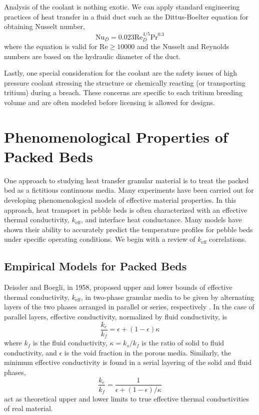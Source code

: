 \documentclass[11pt]{report} %
\begin{document}
Analysis of the coolant is nothing exotic. We can apply standard engineering practices of heat transfer in a fluid duct such as the Dittus-Boelter equation for obtaining Nusselt number,
\begin{equation}
\text{Nu}_D = 0.023 \text{Re}_D^{4/5}\text{Pr}^{0.3}
\end{equation}
where the equation is valid for Re$\ge 10000$ and the Nusselt and Reynolds numbers are based on the hydraulic diameter of the duct.

Lastly, one special consideration for the coolant are the safety issues of high pressure coolant stressing the structure or chemically reacting (or transporting tritium) during a breach. These concerns are specific to each tritium breeding volume and are often modeled before licensing is allowed for designs.


\section{Phenomenological Properties of Packed Beds}
One approach to studying heat transfer granular material is to treat the packed bed as a fictitious continuous media. Many experiments have been carried out for developing phenomenological models of effective material properties. In this approach, heat transport in pebble beds is often characterized with an effective thermal conductivity, $k_\text{eff}$, and interface heat conductance. Many models have shown their ability to accurately predict the temperature profiles for pebble beds under specific operating conditions. We begin with a review of $k_\text{eff}$ correlations.

\subsection{Empirical Models for Packed Beds}
Deissler and Boegli, in 1958, proposed upper and lower bounds of effective thermal conductivity, $k_\text{eff}$, in two-phase granular media to be given by alternating layers of the two phases arranged in parallel or series, respectively \cite{Deissler1958}. In the case of parallel layers, effective conductivity, normalized by fluid conductivity, is
\begin{equation}\label{eq:keff-parallel}
	\frac{k_e}{k_f} = \epsilon + (1-\epsilon)\kappa
\end{equation}
where $k_f$ is the fluid conductivity, $\kappa = k_s/k_f$ is the ratio of solid to fluid conductivity, and $\epsilon$ is the void fraction in the porous media. Similarly, the minimum effective conductivity is found in a serial layering of the solid and fluid phases,
\begin{equation}\label{eq:keff-series}
	\frac{k_e}{k_f} = \frac{1}{\epsilon + (1-\epsilon)/\kappa}
\end{equation}
 act as theoretical upper and lower limits to true effective thermal conductivities of real material.
\end{document}
